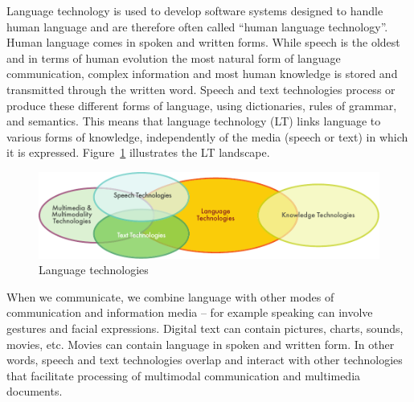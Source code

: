 
\begin{multicols}{2}
Language technology is used to develop software systems designed to handle human language and are therefore often called “human language technology”. Human language comes in spoken and written forms. While speech is the oldest and in terms of human evolution the most natural form of language communication, complex information and most human knowledge is stored and transmitted through the written word. Speech and text technologies process or produce these different forms of language, using dictionaries, rules of grammar, and semantics. This means that language technology (LT) links language to various forms of knowledge, independently of the media (speech or text) in which it is expressed. Figure~\ref{fig:ltincontext_en} illustrates the LT landscape.

\begin{figure}[htb]
  \center
  \includegraphics[width=\textwidth]{../_media/english/language_technologies}
  \caption{Language technologies}
  \label{fig:ltincontext_en}
\end{figure}

 When we communicate, we combine language with other modes of communication and information media – for example speaking can involve gestures and facial expressions. Digital text can contain pictures, charts, sounds, movies, etc. Movies can contain language in spoken and written form. In other words, speech and text technologies overlap and interact with other technologies that facilitate processing of multimodal communication and multimedia documents.


\end{multicols}
